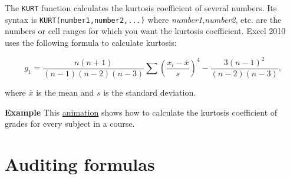 The \texttt{KURT} function calculates the kurtosis coefficient of several numbers. Its syntax is \texttt{KURT(number1,number2,...)} where \emph{number1,number2}, etc. are the numbers or cell ranges for which you want the kurtosis coefficient. Excel 2010 uses the following formula to calculate kurtosis:

\begin{displaymath}
g_1=\frac{n(n+1)}{(n-1)(n-2)(n-3)}\sum \left(\frac{x_i-\bar x}{s}\right)^4 - \frac{3(n-1)^2}{(n-2)(n-3)},
\end{displaymath}

where $\bar x$ is the mean and $s$ is the standard deviation.

\textbf{Example} This \href{http://aprendeconalf.es/office/excel/manual/img/example_function_kurt.gif}{animation} shows how to calculate the kurtosis coefficient of grades for every subject in a course.

% 
% 
% 
% 

\section{Auditing formulas}\hypertarget{auditing-formulas}{}\label{auditing-formulas}

